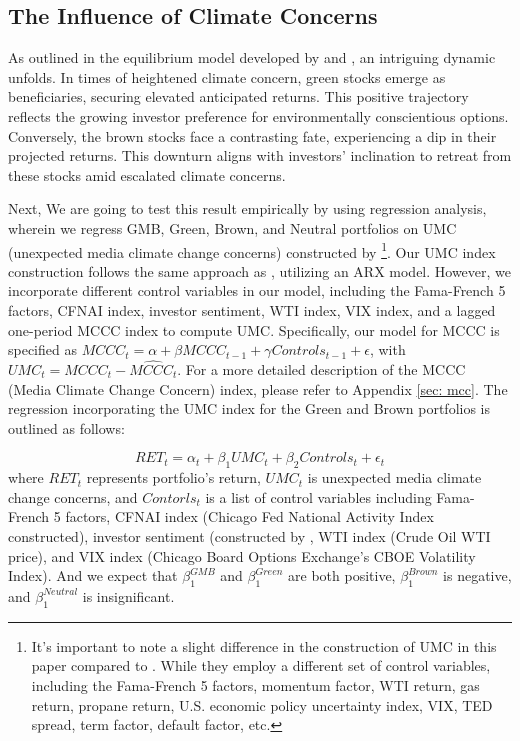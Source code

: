\documentclass[12pt]{article}
\begin{document}
\subsection{The Influence of Climate Concerns}

As outlined in the equilibrium model developed by \cite{pastor2021sustainable} and \cite{pedersen2021responsible}, an intriguing dynamic unfolds. In times of heightened climate concern, green stocks emerge as beneficiaries, securing elevated anticipated returns. This positive trajectory reflects the growing investor preference for environmentally conscientious options. Conversely, the brown stocks face a contrasting fate, experiencing a dip in their projected returns. This downturn aligns with investors' inclination to retreat from these stocks amid escalated climate concerns. 

Next, We are going to test this result empirically by using regression analysis, wherein we regress GMB, Green, Brown, and Neutral portfolios on UMC (unexpected media climate change concerns) constructed by \cite{ardia2022climate}\footnote{It's important to note a slight difference in the construction of UMC in this paper compared to \cite{ardia2022climate}. While they employ a different set of control variables, including the Fama-French 5 factors, momentum factor, WTI return, gas return, propane return, U.S. economic policy uncertainty index, VIX, TED spread, term factor, default factor, etc.}. Our UMC index construction follows the same approach as \cite{ardia2022climate}, utilizing an ARX model. However, we incorporate different control variables in our model, including the Fama-French 5 factors, CFNAI index, investor sentiment, WTI index, VIX index, and a lagged one-period MCCC index to compute UMC. Specifically, our model for MCCC is specified as $MCCC_t = \alpha + \beta MCCC_{t-1} + \gamma Controls_{t-1} + \epsilon$, with $UMC_t = MCCC_t - \widehat{MCCC_t}$. For a more detailed description of the MCCC (Media Climate Change Concern) index, please refer to Appendix \ref{sec: mcc}. The regression incorporating the UMC index for the Green and Brown portfolios is outlined as follows:

\begin{equation}
    RET_t = \alpha_t + \beta_1 UMC_t + \beta_2 Controls_t + \epsilon_t
\label{eqn: test_pastor_model}
\end{equation}
where $RET_t$ represents portfolio's return, $UMC_t$ is unexpected media climate change concerns, and $Contorls_t$ is a list of control variables including Fama-French 5 factors, CFNAI index (Chicago Fed National Activity Index constructed), investor sentiment (constructed by \cite{baker2007investor}, WTI index (Crude Oil WTI price), and VIX index (Chicago Board Options Exchange's CBOE Volatility Index). And we expect that $\beta^{GMB}_1$ and $\beta^{Green}_1$ are both positive, $\beta^{Brown}_1$ is negative, and $\beta^{Neutral}_1$ is insignificant.
\end{document}
